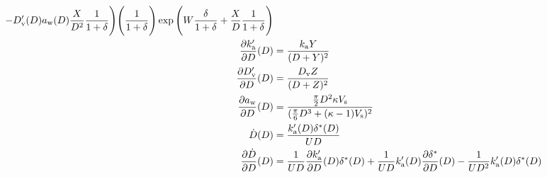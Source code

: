 \documentclass{article}
\begin{document}
\begin{align}
  - D_{\rm v}'(D) a_{\rm w}(D) \frac{X}{D^2} \frac{1}{1 + \delta} \Biggr)
  \Biggl(\frac{1}{1+\delta}\Biggr)
  \exp{\Biggl(W \frac{\delta}{1+\delta} + \frac{X}{D} \frac{1}{1+\delta}\Biggr)} \\
  \frac{\partial k_{\rm a}'}{\partial D}(D) &= \frac{k_{\rm a} Y}{(D+Y)^2} \\
  \frac{\partial D_{\rm v}'}{\partial D}(D) &= \frac{D_{\rm v} Z}{(D+Z)^2} \\
  \frac{\partial a_{\rm w}}{\partial D}(D) &= \frac{\frac{\pi}{2}D^2 \kappa V_{\rm s}}{(\frac{\pi}{6}D^3 + (\kappa - 1) V_{\rm s})^2} \\
  \dot{D}(D) &= \frac{k_{\rm a}'(D) \delta^*(D)}{U D} \\
  \frac{\partial \dot{D}}{\partial D}(D) &=
\frac{1}{U D} 
\frac{\partial k_{\rm a}'}{\partial D}(D) \delta^*(D)
+ \frac{1}{U D} k_{\rm a}'(D) \frac{\partial \delta^*}{\partial D}(D)
- \frac{1}{U D^2} k_{\rm a}'(D) \delta^*(D)
\end{align}
\end{document}
